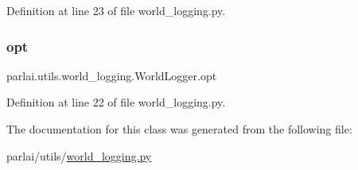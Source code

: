 Definition at line 23 of file world\+\_\+logging.\+py.

\mbox{\label{classparlai_1_1utils_1_1world__logging_1_1WorldLogger_aaf2ae02c76953a68916b5136c1d2cc31}} 
\subsubsection{\texorpdfstring{opt}{opt}}
{\footnotesize\ttfamily parlai.\+utils.\+world\+\_\+logging.\+World\+Logger.\+opt}



Definition at line 22 of file world\+\_\+logging.\+py.



The documentation for this class was generated from the following file\+:\begin{DoxyCompactItemize}
\item 
parlai/utils/\hyperlink{world__logging_8py}{world\+\_\+logging.\+py}\end{DoxyCompactItemize}
